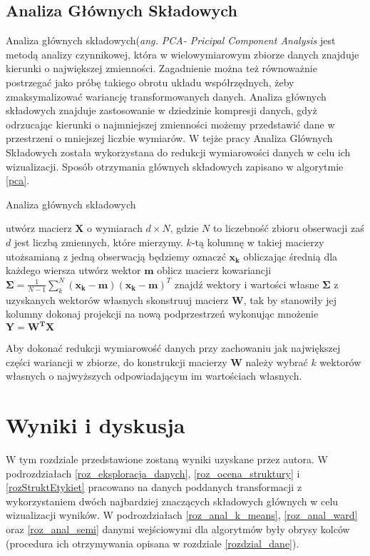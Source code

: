 \documentclass{article}
\begin{document}
\subsection{Analiza Głównych Składowych}
\label{pca_rozdzial}
Analiza głównych składowych(\textit{ang. PCA- Pricipal Component Analysis} jest metodą analizy czynnikowej, która w wielowymiarowym zbiorze danych znajduje kierunki o największej zmienności.
Zagadnienie można też równoważnie postrzegać jako próbę takiego obrotu układu współrzędnych, żeby zmaksymalizować wariancję transformowanych danych.
Analiza głównych składowych znajduje zastosowanie w dziedzinie kompresji danych, gdyż odrzucając kierunki o najmniejszej zmienności możemy przedstawić dane w przestrzeni o mniejszej liczbie wymiarów.
W tejże pracy Analiza Glównych Składowych została wykorzystana do redukcji wymiarowości danych w celu ich wizualizacji.
Sposób otrzymania głównych składowych zapisano w algorytmie \ref{pca}.
\begin{algorithm}[H]

\caption{Analiza głównych składowych}
\label{pca}
\begin{algorithmic}[1]
\STATE utwórz macierz $\textbf{X}$ o wymiarach $d \times N$, gdzie $N$ to liczebność zbioru obserwacji zaś $d$ jest liczbą zmiennych, które mierzymy. $k$-tą kolumnę w takiej macierzy utożsamianą z jedną obserwacją będziemy oznaczć $\mathbf{x_k}$
\STATE obliczając średnią dla każdego wiersza utwórz wektor $\textbf{m}$
\STATE oblicz macierz kowariancji $\mathbf{\Sigma} = \frac{1}{N-1}\sum\limits_k^N(\mathbf{x_k - m})(\mathbf{x_k - m})^T$
\STATE znajdź wektory i wartości własne $\mathbf{\Sigma}$
\STATE z uzyskanych wektorów własnych skonstruuj macierz \textbf{W}, tak by stanowiły jej kolumny
\STATE dokonaj projekcji na nową podprzestrzeń wykonując mnożenie $\mathbf{Y = W^TX}$
\end{algorithmic}
\end{algorithm}
Aby dokonać redukcji wymiarowość danych przy zachowaniu jak największej części wariancji w zbiorze, do konstrukcji macierzy $\mathbf{W}$ należy wybrać $k$ wektorów własnych o najwyższych odpowiadającym im wartościach własnych.

\section{Wyniki i dyskusja}
W tym rozdziale przedstawione zostaną wyniki uzyskane przez autora.
W podrozdziałach \ref{roz_eksploracja_danych}, \ref{roz_ocena_struktury} i \ref{rozStruktEtykiet} pracowano na danych poddanych transformacji z wykorzystaniem dwóch najbardziej znaczących składowych głównych w celu wizualizacji wyników.
W podrozdziałach \ref{roz_anal_k_means}, \ref{roz_anal_ward} oraz \ref{roz_anal_semi} danymi wejściowymi dla algorytmów były obrysy kolców (procedura ich otrzymywania opisana w rozdziale \ref{rozdzial_dane}).
\end{document}

